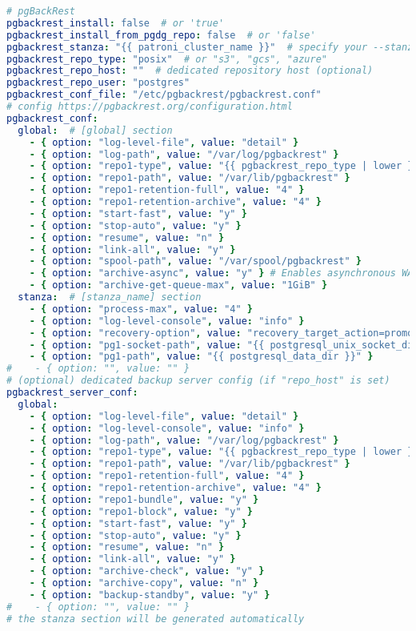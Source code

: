 \begin{flushleft}
\begin{lstlisting}[language=yaml, caption=Testsystem - Deployment - main.yml,captionpos=b,label={lst:testsystem-deployment-main.yml},breaklines=true]
# pgBackRest
pgbackrest_install: false  # or 'true'
pgbackrest_install_from_pgdg_repo: false  # or 'false'
pgbackrest_stanza: "{{ patroni_cluster_name }}"  # specify your --stanza
pgbackrest_repo_type: "posix"  # or "s3", "gcs", "azure"
pgbackrest_repo_host: ""  # dedicated repository host (optional)
pgbackrest_repo_user: "postgres"
pgbackrest_conf_file: "/etc/pgbackrest/pgbackrest.conf"
# config https://pgbackrest.org/configuration.html
pgbackrest_conf:
  global:  # [global] section
    - { option: "log-level-file", value: "detail" }
    - { option: "log-path", value: "/var/log/pgbackrest" }
    - { option: "repo1-type", value: "{{ pgbackrest_repo_type | lower }}" }
    - { option: "repo1-path", value: "/var/lib/pgbackrest" }
    - { option: "repo1-retention-full", value: "4" }
    - { option: "repo1-retention-archive", value: "4" }
    - { option: "start-fast", value: "y" }
    - { option: "stop-auto", value: "y" }
    - { option: "resume", value: "n" }
    - { option: "link-all", value: "y" }
    - { option: "spool-path", value: "/var/spool/pgbackrest" }
    - { option: "archive-async", value: "y" } # Enables asynchronous WAL archiving (details: https://pgbackrest.org/user-guide.html#async-archiving)
    - { option: "archive-get-queue-max", value: "1GiB" }
  stanza:  # [stanza_name] section
    - { option: "process-max", value: "4" }
    - { option: "log-level-console", value: "info" }
    - { option: "recovery-option", value: "recovery_target_action=promote" }
    - { option: "pg1-socket-path", value: "{{ postgresql_unix_socket_dir }}" }
    - { option: "pg1-path", value: "{{ postgresql_data_dir }}" }
#    - { option: "", value: "" }
# (optional) dedicated backup server config (if "repo_host" is set)
pgbackrest_server_conf:
  global:
    - { option: "log-level-file", value: "detail" }
    - { option: "log-level-console", value: "info" }
    - { option: "log-path", value: "/var/log/pgbackrest" }
    - { option: "repo1-type", value: "{{ pgbackrest_repo_type | lower }}" }
    - { option: "repo1-path", value: "/var/lib/pgbackrest" }
    - { option: "repo1-retention-full", value: "4" }
    - { option: "repo1-retention-archive", value: "4" }
    - { option: "repo1-bundle", value: "y" }
    - { option: "repo1-block", value: "y" }
    - { option: "start-fast", value: "y" }
    - { option: "stop-auto", value: "y" }
    - { option: "resume", value: "n" }
    - { option: "link-all", value: "y" }
    - { option: "archive-check", value: "y" }
    - { option: "archive-copy", value: "n" }
    - { option: "backup-standby", value: "y" }
#    - { option: "", value: "" }
# the stanza section will be generated automatically


\end{lstlisting}
\end{flushleft}
